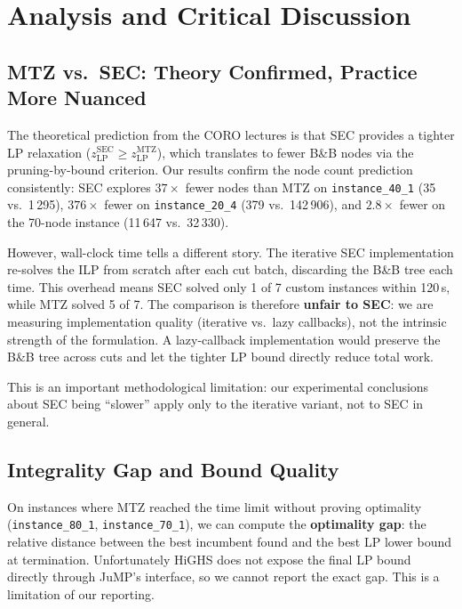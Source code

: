 \documentclass[12pt, a4paper]{article}
\begin{document}
\section{Analysis and Critical Discussion}

\subsection{MTZ vs.\ SEC: Theory Confirmed, Practice More Nuanced}

The theoretical prediction from the CORO lectures is that SEC provides a tighter LP
relaxation ($z_{\mathrm{LP}}^{\mathrm{SEC}} \geq z_{\mathrm{LP}}^{\mathrm{MTZ}}$),
which translates to fewer B\&B nodes via the pruning-by-bound criterion. Our results
confirm the node count prediction consistently: SEC explores $37\times$ fewer nodes
than MTZ on \texttt{instance\_40\_1} (35 vs.\ 1\,295), $376\times$ fewer on
\texttt{instance\_20\_4} (379 vs.\ 142\,906), and $2.8\times$ fewer on the 70-node
instance (11\,647 vs.\ 32\,330).

However, wall-clock time tells a different story. The iterative SEC implementation
re-solves the ILP from scratch after each cut batch, discarding the B\&B tree each
time. This overhead means SEC solved only 1 of 7 custom instances within 120\,s,
while MTZ solved 5 of 7. The comparison is therefore \textbf{unfair to SEC}: we are
measuring implementation quality (iterative vs.\ lazy callbacks), not the intrinsic
strength of the formulation. A lazy-callback implementation would preserve the B\&B
tree across cuts and let the tighter LP bound directly reduce total work.

This is an important methodological limitation: our experimental conclusions about
SEC being ``slower'' apply only to the iterative variant, not to SEC in general.

\subsection{Integrality Gap and Bound Quality}

On instances where MTZ reached the time limit without proving optimality
(\texttt{instance\_80\_1}, \texttt{instance\_70\_1}), we can compute the
\textbf{optimality gap}: the relative distance between the best incumbent found
and the best LP lower bound at termination. Unfortunately HiGHS does not
expose the final LP bound directly through JuMP's interface, so we cannot report
the exact gap. This is a limitation of our reporting.
\end{document}
